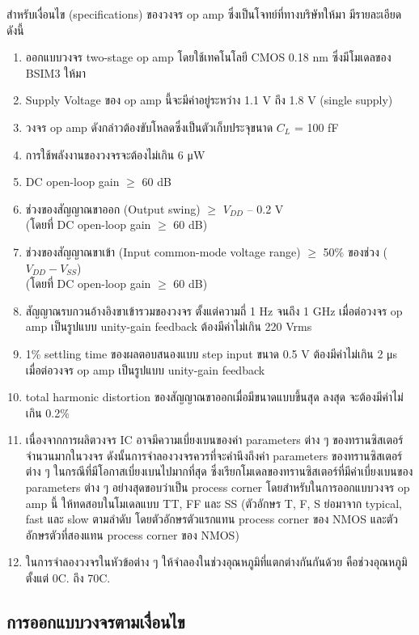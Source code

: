\documentclass[a4paper, 11pt, oneside]{book} %
\begin{document}
สำหรับเงื่อนไข (specifications) ของวงจร op amp ซึ่งเป็นโจทย์ที่ทางบริษัทให้มา มีรายละเอียดดังนี้

\begin{enumerate}
    \item ออกแบบวงจร two-stage op amp โดยใช้เทคโนโลยี CMOS 0.18 nm ซึ่งมีโมเดลของ BSIM3 ให้มา
    \item Supply Voltage ของ op amp นี้จะมีค่าอยู่ระหว่าง 1.1 V ถึง 1.8 V (single supply)
    \item วงจร op amp ดังกล่าวต้องขับโหลดซึ่งเป็นตัวเก็บประจุขนาด $C_L$ = 100 \si{\femto F}
    \item การใช้พลังงานของวงจรจะต้องไม่เกิน 6 \si{\micro W}
    \item DC open-loop gain $\geq$ 60 dB
    \item ช่วงของสัญญาณขาออก (Output swing) $\geq$ $V_{DD}$ – 0.2 V \\(โดยที่ DC open-loop gain $\geq$ 60 dB)
    \item ช่วงของสัญญาณขาเข้า (Input common-mode voltage range) $\geq$ 50\% ของช่วง ($V_{DD} - V_{SS}$) \\(โดยที่ DC open-loop gain $\geq$ 60 dB)
    \item สัญญาณรบกวนอ้างอิงขาเข้ารวมของวงจร ตั้งแต่ความถี่ 1 Hz จนถึง 1 GHz เมื่อต่อวงจร op amp เป็นรูปแบบ unity-gain feedback ต้องมีค่าไม่เกิน 220 \textmu Vrms
    \item 1\% settling time ของผลตอบสนองแบบ step input ขนาด 0.5 V ต้องมีค่าไม่เกิน 2 \si{\micro s} เมื่อต่อวงจร op amp เป็นรูปแบบ unity-gain feedback
    \item total harmonic distortion ของสัญญาณขาออกเมื่อมีขนาดแบบขึ้นสุด ลงสุด จะต้องมีค่าไม่เกิน 0.2\%
    \item เนื่องจากการผลิตวงจร IC อาจมีความเบี่ยงเบนของค่า parameters ต่าง ๆ ของทรานซิสเตอร์จำนวนมากในวงจร ดังนั้นการจำลองวงจรควรที่จะคำนึงถึงค่า parameters ของทรานซิสเตอร์ต่าง ๆ ในกรณีที่มีโอกาสเบี่ยงเบนไปมากที่สุด ซึ่งเรียกโมเดลของทรานซิสเตอร์ที่มีค่าเบี่ยงเบนของ parameters ต่าง ๆ อย่างสุดขอบว่าเป็น process corner โดยสำหรับในการออกแบบวงจร op amp นี้ ให้ทดสอบในโมเดลแบบ TT, FF และ SS (ตัวอักษร T, F, S ย่อมาจาก typical, fast และ slow ตามลำดับ โดยตัวอักษรตัวแรกแทน process corner ของ NMOS และตัวอักษรตัวที่สองแทน process corner ของ NMOS)
    \item ในการจำลองวงจรในหัวข้อต่าง ๆ ให้จำลองในช่วงอุณหภูมิที่แตกต่างกันกันด้วย คือช่วงอุณหภูมิตั้งแต่  0\degree C. ถึง 70\degree C.
\end{enumerate}

\subsection{การออกแบบวงจรตามเงื่อนไข}
\end{document}
